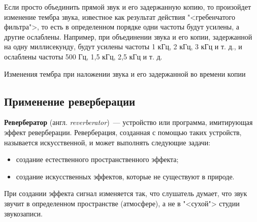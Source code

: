 \documentclass{beamer}
\begin{document}
\begin{frame}
  Если просто объединить прямой звук и его задержанную копию, то произойдет изменение тембра звука, известное как результат действия "<гребенчатого фильтра">, то есть в определенном порядке одни частоты будут усилены, а другие ослаблены. Например, при объединении звука и его копии, задержанной на одну миллисекунду, будут усилены частоты 1 кГц, 2 кГц, 3 кГц и т. д., и ослаблены частоты 500 Гц, 1,5 кГц, 2,5 кГц и т. д. 

  \begin{block}{Изменения тембра при наложении звука и его задержанной во времени копии}
  \end{block}  
\end{frame}

\subsection{Применение реверберации}
\begin{frame}
  \textbf{Ревербератор} (англ. \emph{reverberator})~--- устройство или программа, имитирующая эффект реверберации. Реверберация, созданная с помощью таких устройств, называется искусственной, и может выполнять следующие задачи:

  \begin{itemize}
    \item создание естественного пространственного эффекта;
    \item создание искусственных эффектов, которые не существуют в природе.
  \end{itemize}

  При создании эффекта сигнал изменяется так, что слушатель думает, что звук звучит в определенном пространстве (атмосфере), а не в "<сухой"> студии звукозаписи.
\end{frame}
\end{document}
